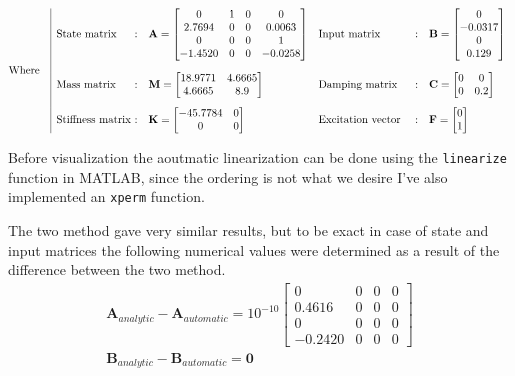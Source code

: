 \documentclass[12pt]{article}
\begin{document}
\begin{equation*}
	\begin{aligned}
	\text{Where}
	 \quad
	  \begin{array}{|l@{} c l l c l}
		  \text{State matrix}  & :  & \textbf{A} = \begin{bmatrix}
        0 & 1 & 0 & 0 \\
        2.7694 & 0 & 0 & 0.0063 \\
        0 & 0 & 0 & 1 \\
        -1.4520 & 0 & 0 & -0.0258 
      \end{bmatrix} &
		  \text{Input matrix}  & :  & \textbf{B} = \begin{bmatrix}
        0 \\
        -0.0317 \\
        0 \\
        0.129
      \end{bmatrix} \\[1.0cm]
      \text{Mass matrix } & : & \textbf{M}= \begin{bmatrix}
        18.9771 & 4.6665 \\
        4.6665 & 8.9
      \end{bmatrix} &
      \text{Damping matrix } & : & \textbf{C} = \begin{bmatrix}
        0 & 0 \\
        0 & 0.2
      \end{bmatrix} \\[0.5cm]
      \text{Stiffness matrix } & : & \textbf{K} = \begin{bmatrix}
        -45.7784 & 0 \\
        0 & 0 
      \end{bmatrix} &
      \text{Excitation vector } & : & \textbf{F}= \begin{bmatrix}
        0\\
        1
      \end{bmatrix}
	  \end{array}
  \end{aligned}
\end{equation*}

\noindent Before visualization the aoutmatic linearization can be done using the \texttt{linearize} function in MATLAB, since the ordering is not what we desire I've also implemented an \texttt{xperm} function.

\noindent The two method gave very similar results, but to be exact in case of state and input matrices the following numerical values were determined as a result of the difference between the two method.
\begin{gather}
  \mathbf{A}_{analytic} - \mathbf{A}_{automatic} = 10^{-10} \begin{bmatrix}
    0 & 0 & 0 & 0 \\
    0.4616 & 0 & 0 & 0 \\
    0 & 0 & 0 & 0 \\
    -0.2420  & 0 & 0 & 0 
  \end{bmatrix} \\
  \mathbf{B}_{analytic} - \mathbf{B}_{automatic} = \mathbf{0}
\end{gather}
\end{document}
